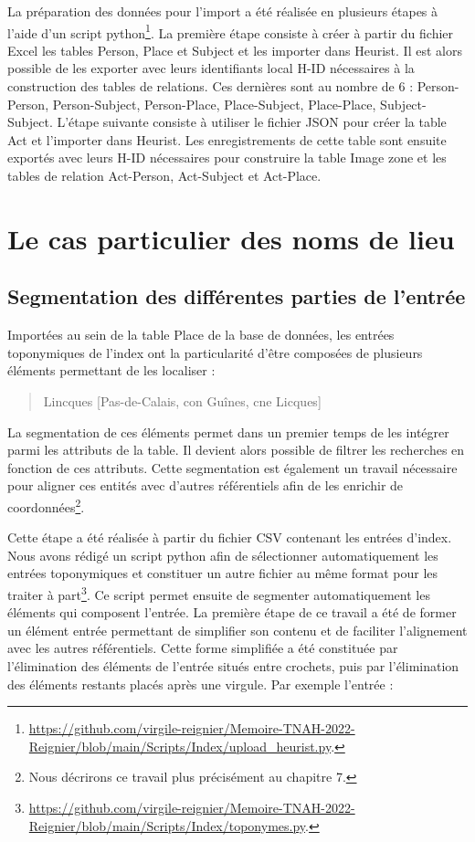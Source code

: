 \documentclass[a4paper,12pt,twoside]{book}
\begin{document}
	La préparation des données pour l'import a été réalisée en plusieurs étapes à l'aide d'un script python\footnote{\url{https://github.com/virgile-reignier/Memoire-TNAH-2022-Reignier/blob/main/Scripts/Index/upload_heurist.py}.}. La première étape consiste à créer à partir du fichier Excel les tables Person, Place et Subject et les importer dans Heurist. Il est alors possible de les exporter avec leurs identifiants local H-ID nécessaires à la construction des tables de relations. Ces dernières sont au nombre de 6 : Person-Person, Person-Subject, Person-Place, Place-Subject, Place-Place, Subject-Subject. L'étape suivante consiste à utiliser le fichier JSON pour créer la table Act et l'importer dans Heurist. Les enregistrements de cette table sont ensuite exportés avec leurs H-ID nécessaires pour construire la table Image zone et les tables de relation Act-Person, Act-Subject et Act-Place.
	
	\section{Le cas particulier des noms de lieu}
	
	\subsection{Segmentation des différentes parties de l'entrée}
	
	Importées au sein de la table Place de la base de données, les entrées toponymiques de l'index ont la particularité d'être composées de plusieurs éléments permettant de les localiser :
	
	 \begin{quotation}
	 	Lincques [Pas-de-Calais, con Guînes, cne Licques]
	 \end{quotation}
	
	
	\noindent La segmentation de ces éléments permet dans un premier temps de les intégrer parmi les attributs de la table. Il devient alors possible de filtrer les recherches en fonction de ces attributs. Cette segmentation est également un travail nécessaire pour aligner ces entités avec d'autres référentiels afin de les enrichir de coordonnées\footnote{Nous décrirons ce travail plus précisément au chapitre 7.}.
	
	Cette étape a été réalisée à partir du fichier CSV contenant les entrées d'index. Nous avons rédigé un script python afin de sélectionner automatiquement les entrées toponymiques et constituer un autre fichier au même format pour les traiter à part\footnote{\url{https://github.com/virgile-reignier/Memoire-TNAH-2022-Reignier/blob/main/Scripts/Index/toponymes.py}.}. Ce script permet ensuite de segmenter automatiquement les éléments qui composent l'entrée. La première étape de ce travail a été de former un élément \og entrée\fg{} permettant de simplifier son contenu et de faciliter l'alignement avec les autres référentiels. Cette forme simplifiée a été constituée par l'élimination des éléments de l'entrée situés entre crochets, puis par l'élimination des éléments restants placés après une virgule. Par exemple l'entrée :
	
\end{document}
